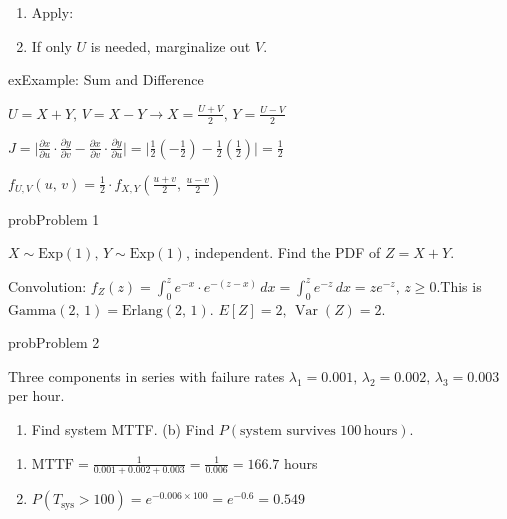 \begin{enumerate}
\def\labelenumi{\arabic{enumi}.}
\setcounter{enumi}{2}
\item
  Apply:
\item
  If only $U$ is needed, marginalize out $V$.
\end{enumerate}

\begin{PSbox}[unbreakable]{ex}{Example: Sum and Difference}

$\displaystyle U = X + Y,\, V = X - Y \to X = \frac{U+V}{2},\, Y = \frac{U-V}{2}$

$\displaystyle J = \lvert \frac{\partial x}{\partial u} \cdot \frac{\partial y}{\partial v} - \frac{\partial x}{\partial v} \cdot \frac{\partial y}{\partial u}\rvert = \lvert \frac{1}{2}\left(-\frac{1}{2}\right) - \frac{1}{2}\left(\frac{1}{2}\right)\rvert = \frac{1}{2}$

$\displaystyle f_{U,V}(u,\,v) = \frac{1}{2} \cdot f_{X,Y}\left(\frac{u+v}{2},\, \frac{u-v}{2}\right)$

\end{PSbox}


\begin{PSbox}[unbreakable]{prob}{Problem 1}

$X \sim \mathrm{Exp}(1),\, Y \sim \mathrm{Exp}(1)$, independent. Find the PDF of $Z = X + Y$.

\PSsolution{} Convolution: $f_{Z}(z) = \int_{0}^{z} e^{-x} \cdot e^{-(z-x)}\,dx = \int_{0}^{z} e^{-z}\,dx = ze^{-z},\, z \ge 0$.\PSbr{}This is $\mathrm{Gamma}(2,\,1) = \mathrm{Erlang}(2,\,1)$. $E[Z] = 2,\, \operatorname{Var}(Z) = 2$.

\end{PSbox}

\begin{PSbox}[unbreakable]{prob}{Problem 2}

Three components in series with failure rates $\lambda_{1} = 0.001,\, \lambda_{2} = 0.002,\, \lambda_{3} = 0.003$ per hour.

\begin{enumerate}
\def\labelenumi{(\alph{enumi})}
\tightlist
\item
  Find system MTTF. (b) Find $P(\text{system survives 100}\,\mathrm{hours})$.
\end{enumerate}

\PSsolution{} 

\begin{enumerate}
\def\labelenumi{(\alph{enumi})}
\tightlist
\item
  $\mathrm{MTTF} = \frac{1}{0.001+0.002+0.003} = \frac{1}{0.006} = 166.7$ hours
\item
  $P(T_{\text{sys}} > 100) = e^{-0.006 \times 100} = e^{-0.6} = 0.549$
\end{enumerate}

\end{PSbox}

